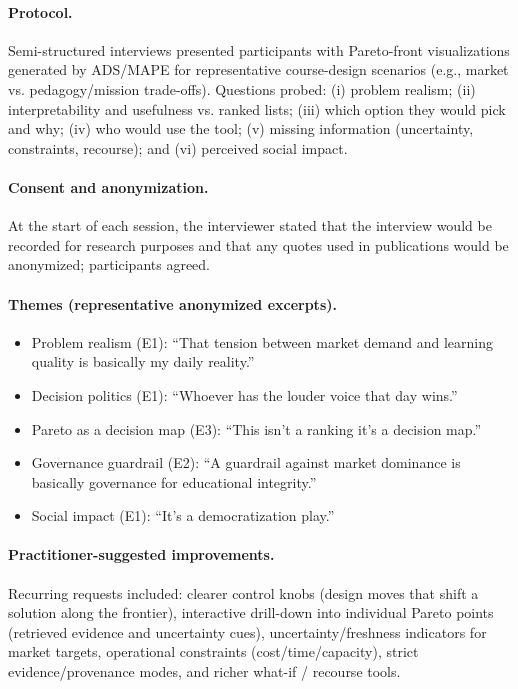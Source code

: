 \documentclass{article}
\newcommand{\ADS}{\textsc{ADS}\xspace}
\newcommand{\MAPE}{\textsc{MAPE}\xspace}
\begin{document}
\paragraph{Protocol.} Semi-structured interviews presented participants with Pareto-front visualizations generated by \ADS/\MAPE for representative course-design scenarios (e.g., market vs. pedagogy/mission trade-offs). Questions probed: (i) problem realism; (ii) interpretability and usefulness vs. ranked lists; (iii) which option they would pick and why; (iv) who would use the tool; (v) missing information (uncertainty, constraints, recourse); and (vi) perceived social impact.

\paragraph{Consent and anonymization.} At the start of each session, the interviewer stated that the interview would be recorded for research purposes and that any quotes used in publications would be anonymized; participants agreed.

\paragraph{Themes (representative anonymized excerpts).}
\begin{itemize}
  \item {Problem realism (E1):} ``That tension between market demand and learning quality is basically my daily reality.''
  \item {Decision politics (E1):} ``Whoever has the louder voice that day wins.''
  \item {Pareto as a decision map (E3):} ``This isn't a ranking it's a decision map.''
  \item {Governance guardrail (E2):} ``A guardrail against market dominance is basically governance for educational integrity.''
  \item {Social impact (E1):} ``It's a democratization play.''
\end{itemize}

\paragraph{Practitioner-suggested improvements.} Recurring requests included: clearer control knobs (design moves that shift a solution along the frontier), interactive drill-down into individual Pareto points (retrieved evidence and uncertainty cues), uncertainty/freshness indicators for market targets, operational constraints (cost/time/capacity), strict evidence/provenance modes, and richer what-if / recourse tools.
\end{document}
